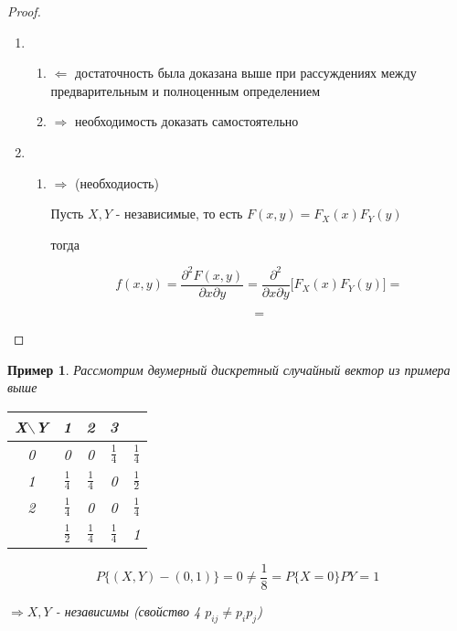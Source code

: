 \documentclass[a4paper, 14pt]{report}
\newtheorem{example}{Пример}[section]
\begin{document}
\begin{proof}
\begin{enumerate}
        \item

            \begin{enumerate}
                \item $\Leftarrow$ достаточность была доказана выше при рассуждениях между предварительным и полноценным определением

                \item $\Rightarrow$ необходимость доказать самостоятельно
            \end{enumerate}

        \item

            \begin{enumerate}
                \item $\Rightarrow$ (необходиость)

                    Пусть $X,Y$ - независимые, то есть $F(x,y) = F_X(x) F_Y(y)$


                    тогда

                    $$
                    f(x,y) = \frac{\partial^2 F(x,y)}{\partial x \partial y} = \frac{\partial^2}{\partial x \partial y} \bigg[ F_X(x) F_Y(y) \bigg] =
                    $$

                    $$
                    =
                    $$

            \end{enumerate}
    \end{enumerate}
\end{proof}

\begin{example}
    Рассмотрим двумерный дискретный случайный вектор из примера выше

    \begin{table}[H]
        \centering
        \begin{tabular}{|c||c|c|c||c|}
            \hline
            X$\backslash$Y & 1 & 2 & 3 & \\
            \hline
            \hline
            0  & 0 & 0 & $\frac{1}{4}$ & $\frac{1}{4}$ \\
            \hline
            1 & $\frac{1}{4}$ & $\frac{1}{4}$ & 0 & $\frac{1}{2}$ \\
            \hline
            2 & $\frac{1}{4}$ & 0 & 0 & $\frac{1}{4}$\\
            \hline
            \hline
            & $\frac{1}{2}$ & $\frac{1}{4}$ & $\frac{1}{4}$ & 1\\
            \hline
        \end{tabular}
    \end{table}

    $$
    P\{(X,Y) - (0,1)\} = 0 \ne \frac{1}{8} = P\{X=0\}P{Y=1}
    $$

    $\Rightarrow X,Y$ - независимы (свойство 4 $p_{ij} \ne p_ip_j$)
\end{example}
\end{document}
